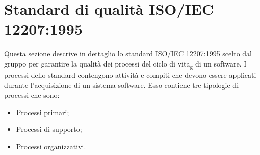 \section{Standard di qualità ISO/IEC 12207:1995}
Questa sezione descrive in dettaglio lo standard ISO/IEC 12207:1995 scelto dal gruppo per garantire la qualità dei processi del ciclo di vita\textsubscript{g} di un software. I processi dello standard contengono attività e compiti che devono essere applicati durante l'acquisizione di un sistema software. Esso contiene tre tipologie di processi che sono: 
\begin{itemize}
\item Processi primari;
\item Processi di supporto;
\item Processi organizzativi.
\end{itemize}



